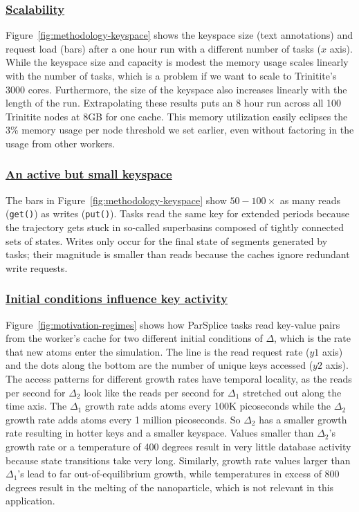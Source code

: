 \subsubsection{\underline{Scalability}} Figure~\ref{fig:methodology-keyspace} shows the
keyspace size (text annotations) and request load (bars) after a one hour run
with a different number of tasks (\(x\) axis). While the keyspace size and
capacity is modest the memory usage scales linearly with the number
of tasks, which is a problem if we want to scale to Trinitite's 3000 cores.
Furthermore, the size of the keyspace also increases linearly with the length
of the run.  Extrapolating these results puts an 8 hour run across all 100
Trinitite nodes at 8GB for one cache.  This memory utilization easily eclipses
the 3\% memory usage per node threshold we set earlier, even without factoring
in the usage from other workers.

\subsubsection{\underline{An active but small keyspace}}

The bars in Figure~\ref{fig:methodology-keyspace} show \(50-100\times\) as many
reads (\texttt{get()}) as writes (\texttt{put()}).  Tasks read the same key for
extended periods because the trajectory gets stuck in so-called superbasins
composed of tightly connected sets of states.  Writes only occur for the final
state of segments generated by tasks; their magnitude is smaller than reads
because the caches ignore redundant write requests. 

\subsubsection{\underline{Initial conditions influence key activity}}
\label{sec:delta}
Figure~\ref{fig:motivation-regimes} shows how ParSplice tasks read key-value
pairs from the worker's cache for two different initial conditions of
\(\Delta\), which is the rate that new atoms enter the simulation.  The line is
the read request rate (\(y1\) axis) and the dots along the bottom are the
number of unique keys accessed (\(y2\) axis).  The access patterns for
different growth rates have temporal locality, as the reads per second for
\(\Delta_2\) look like the reads per second for \(\Delta_1\) stretched out
along the time axis.  The \(\Delta_1\) growth rate adds atoms every 100K
picoseconds while the \(\Delta_2\) growth rate adds atoms every 1 million
picoseconds. So \(\Delta_2\) has a smaller growth rate resulting in hotter
keys and a smaller keyspace.  Values smaller than \(\Delta_2\)'s growth rate or
a temperature of 400 degrees result in very little database activity because
state transitions take very long. Similarly, growth rate values larger than \(\Delta_1\)'s
lead to far out-of-equilibrium growth, while temperatures in excess of 800 degrees
result in the melting of the nanoparticle, which is not relevant in this application.

